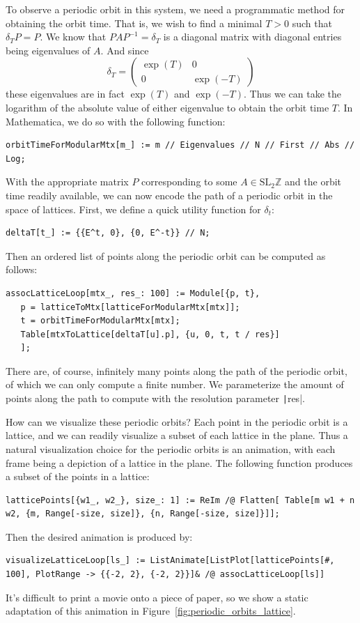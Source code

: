 \documentclass[12pt,twoside]{reedthesis}
\theoremstyle{definition}
\newcommand{\Z}{\mathbb{Z}}
\newcommand{\SLZ}{\mathrm{SL}_2{\Z}}
\begin{document}
To observe a periodic orbit in this system, we need a programmatic method for obtaining the orbit time.
That is, we wish to find a minimal $T > 0$ such that $\delta_T P = P$.
We know that $PAP^{-1} = \delta_T$ is a diagonal matrix with diagonal entries being eigenvalues of $A$.
And since
\begin{equation*}
  \delta_T = \begin{pmatrix}
    \exp(T) & 0 \\
    0 & \exp(-T)
  \end{pmatrix}
\end{equation*}
these eigenvalues are in fact $\exp(T)$ and $\exp(-T)$.
Thus we can take the logarithm of the absolute value of either eigenvalue to obtain the orbit time $T$.
In Mathematica, we do so with the following function:
\begin{verbatim}
orbitTimeForModularMtx[m_] := m // Eigenvalues // N // First // Abs // Log;
\end{verbatim}

With the appropriate matrix $P$ corresponding to some $A \in \SLZ$ and the orbit time readily available, we can now encode the path of a periodic orbit in the space of lattices.
First, we define a quick utility function for $\delta_t$:
\begin{verbatim}
deltaT[t_] := {{E^t, 0}, {0, E^-t}} // N;
\end{verbatim}
Then an ordered list of points along the periodic orbit can be computed as follows:
\begin{verbatim}
assocLatticeLoop[mtx_, res_: 100] := Module[{p, t},
   p = latticeToMtx[latticeForModularMtx[mtx]];
   t = orbitTimeForModularMtx[mtx];
   Table[mtxToLattice[deltaT[u].p], {u, 0, t, t / res}]
   ];
\end{verbatim}
There are, of course, infinitely many points along the path of the periodic orbit, of which we can only compute a finite number.
We parameterize the amount of points along the path to compute with the resolution parameter \texttt|res|.

How can we visualize these periodic orbits?
Each point in the periodic orbit is a lattice, and we can readily visualize a subset of each lattice in the plane.
Thus a natural visualization choice for the periodic orbits is an animation, with each frame being a depiction of a lattice in the plane.
The following function produces a subset of the points in a lattice:
\begin{verbatim}
latticePoints[{w1_, w2_}, size_: 1] := ReIm /@ Flatten[ Table[m w1 + n w2, {m, Range[-size, size]}, {n, Range[-size, size]}]];
\end{verbatim}
Then the desired animation is produced by:
\begin{verbatim}
visualizeLatticeLoop[ls_] := ListAnimate[ListPlot[latticePoints[#, 100], PlotRange -> {{-2, 2}, {-2, 2}}]& /@ assocLatticeLoop[ls]]
\end{verbatim}
It's difficult to print a movie onto a piece of paper, so we show a static adaptation of this animation in Figure~\ref{fig:periodic_orbits_lattice}.
\end{document}
